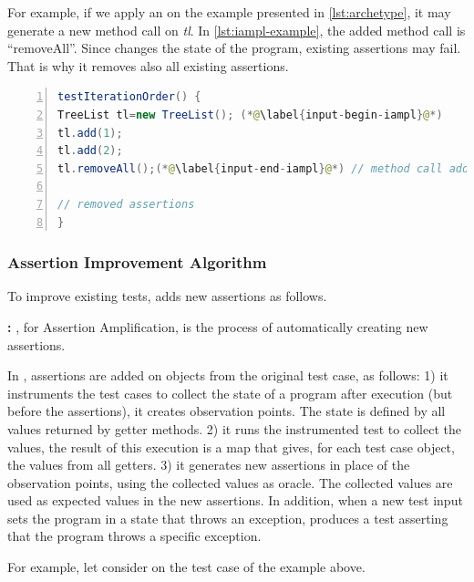 For example, if we apply an \Iampl on the example presented in \autoref{lst:archetype}, it may generate a new method call on \emph{tl}.
In \autoref{lst:iampl-example}, the added method call is ``removeAll''. Since \dspot changes the state of the program, existing assertions may fail. That is why it removes also all existing assertions.


\begin{lstlisting}[caption={An example of an \Iampl{}: the amplification added a method call to \emph{removeAll()} on \emph{tl}.},label=lst:iampl-example,float,language=java,numbers=left] 
testIterationOrder() {
TreeList tl=new TreeList(); (*@\label{input-begin-iampl}@*)
tl.add(1);
tl.add(2);
tl.removeAll();(*@\label{input-end-iampl}@*) // method call added

// removed assertions
}
\end{lstlisting}

\subsubsection{Assertion Improvement Algorithm}
\label{subsec:new-assertions}

To improve existing tests, \dspot adds new assertions as follows.

\textbf{\Aampl:} \Aampl, for Assertion Amplification, is the process of automatically creating new assertions.

In \dspot, assertions are added on objects from the original test case, as follows: 
1) it instruments the  test cases to collect the state of a program after execution (but before the assertions), \ie it creates observation points. The state is defined by all values returned by getter methods.
2) it runs the instrumented test to collect the values,
the result of this execution is a map that gives, for each test case object, the values from all getters.
3) it generates new assertions in place of the observation points, using the collected values as oracle. The collected values are used as expected values in the new assertions.
In addition, when a new test input sets the program in a state that throws an exception,  \dspot produces a test asserting that the program throws a specific exception.

For example, let consider \Aampl{} on the test case of the example above. 


